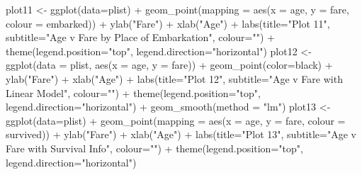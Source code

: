 \documentclass[
]{article}
\newenvironment{Shaded}{\begin{snugshade}}{\end{snugshade}}
\newcommand{\AttributeTok}[1]{\textcolor[rgb]{0.77,0.63,0.00}{#1}}
\newcommand{\FunctionTok}[1]{\textcolor[rgb]{0.00,0.00,0.00}{#1}}
\newcommand{\NormalTok}[1]{#1}
\newcommand{\OtherTok}[1]{\textcolor[rgb]{0.56,0.35,0.01}{#1}}
\newcommand{\SpecialCharTok}[1]{\textcolor[rgb]{0.00,0.00,0.00}{#1}}
\newcommand{\StringTok}[1]{\textcolor[rgb]{0.31,0.60,0.02}{#1}}
\begin{document}
\begin{Shaded}
\begin{Highlighting}[]
\NormalTok{plot11 }\OtherTok{\textless{}{-}} \FunctionTok{ggplot}\NormalTok{(}\AttributeTok{data=}\NormalTok{plist) }\SpecialCharTok{+} \FunctionTok{geom\_point}\NormalTok{(}\AttributeTok{mapping =} \FunctionTok{aes}\NormalTok{(}\AttributeTok{x =}\NormalTok{ age, }\AttributeTok{y =}\NormalTok{ fare, }\AttributeTok{colour =}\NormalTok{ embarked)) }\SpecialCharTok{+} \FunctionTok{ylab}\NormalTok{(}\StringTok{"Fare"}\NormalTok{) }\SpecialCharTok{+} \FunctionTok{xlab}\NormalTok{(}\StringTok{"Age"}\NormalTok{) }\SpecialCharTok{+} \FunctionTok{labs}\NormalTok{(}\AttributeTok{title=}\StringTok{"Plot 11"}\NormalTok{, }\AttributeTok{subtitle=}\StringTok{"Age v Fare by Place of Embarkation"}\NormalTok{, }\AttributeTok{colour=}\StringTok{""}\NormalTok{) }\SpecialCharTok{+} \FunctionTok{theme}\NormalTok{(}\AttributeTok{legend.position=}\StringTok{"top"}\NormalTok{, }\AttributeTok{legend.direction=}\StringTok{"horizontal"}\NormalTok{)}
\NormalTok{plot12 }\OtherTok{\textless{}{-}} \FunctionTok{ggplot}\NormalTok{(}\AttributeTok{data =}\NormalTok{ plist, }\FunctionTok{aes}\NormalTok{(}\AttributeTok{x =}\NormalTok{ age, }\AttributeTok{y =}\NormalTok{ fare)) }\SpecialCharTok{+} \FunctionTok{geom\_point}\NormalTok{(}\AttributeTok{color=}\StringTok{\textquotesingle{}black\textquotesingle{}}\NormalTok{) }\SpecialCharTok{+} \FunctionTok{ylab}\NormalTok{(}\StringTok{"Fare"}\NormalTok{) }\SpecialCharTok{+} \FunctionTok{xlab}\NormalTok{(}\StringTok{"Age"}\NormalTok{) }\SpecialCharTok{+} \FunctionTok{labs}\NormalTok{(}\AttributeTok{title=}\StringTok{"Plot 12"}\NormalTok{, }\AttributeTok{subtitle=}\StringTok{"Age v Fare with Linear Model"}\NormalTok{, }\AttributeTok{colour=}\StringTok{""}\NormalTok{) }\SpecialCharTok{+} \FunctionTok{theme}\NormalTok{(}\AttributeTok{legend.position=}\StringTok{"top"}\NormalTok{, }\AttributeTok{legend.direction=}\StringTok{"horizontal"}\NormalTok{)  }\SpecialCharTok{+} \FunctionTok{geom\_smooth}\NormalTok{(}\AttributeTok{method =} \StringTok{"lm"}\NormalTok{)}
\NormalTok{plot13 }\OtherTok{\textless{}{-}} \FunctionTok{ggplot}\NormalTok{(}\AttributeTok{data=}\NormalTok{plist) }\SpecialCharTok{+} \FunctionTok{geom\_point}\NormalTok{(}\AttributeTok{mapping =} \FunctionTok{aes}\NormalTok{(}\AttributeTok{x =}\NormalTok{ age, }\AttributeTok{y =}\NormalTok{ fare, }\AttributeTok{colour =}\NormalTok{ survived)) }\SpecialCharTok{+} \FunctionTok{ylab}\NormalTok{(}\StringTok{"Fare"}\NormalTok{) }\SpecialCharTok{+} \FunctionTok{xlab}\NormalTok{(}\StringTok{"Age"}\NormalTok{) }\SpecialCharTok{+} \FunctionTok{labs}\NormalTok{(}\AttributeTok{title=}\StringTok{"Plot 13"}\NormalTok{, }\AttributeTok{subtitle=}\StringTok{"Age v Fare with Survival Info"}\NormalTok{, }\AttributeTok{colour=}\StringTok{""}\NormalTok{) }\SpecialCharTok{+} \FunctionTok{theme}\NormalTok{(}\AttributeTok{legend.position=}\StringTok{"top"}\NormalTok{, }\AttributeTok{legend.direction=}\StringTok{"horizontal"}\NormalTok{)}

\end{Highlighting}
\end{Shaded}
\end{document}
